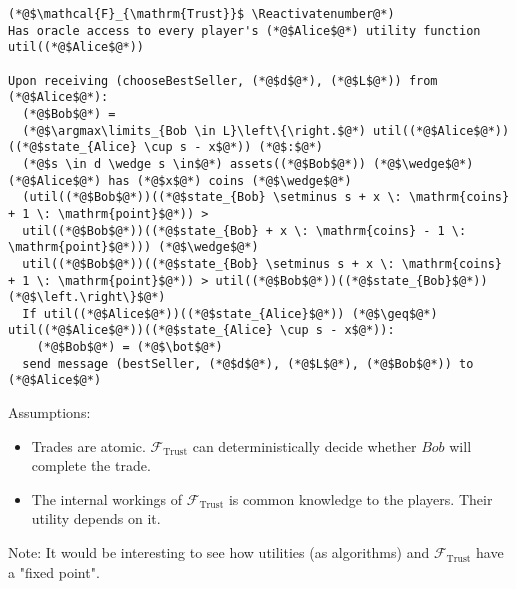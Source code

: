 \Suppressnumber
\begin{lstlisting}[label=trustfunc, style=numbers]
(*@$\mathcal{F}_{\mathrm{Trust}}$ \Reactivatenumber@*)
Has oracle access to every player's (*@$Alice$@*) utility function util((*@$Alice$@*))

Upon receiving (chooseBestSeller, (*@$d$@*), (*@$L$@*)) from (*@$Alice$@*):
  (*@$Bob$@*) =
  (*@$\argmax\limits_{Bob \in L}\left\{\right.$@*) util((*@$Alice$@*))((*@$state_{Alice} \cup s - x$@*)) (*@$:$@*)
  (*@$s \in d \wedge s \in$@*) assets((*@$Bob$@*)) (*@$\wedge$@*) (*@$Alice$@*) has (*@$x$@*) coins (*@$\wedge$@*)
  (util((*@$Bob$@*))((*@$state_{Bob} \setminus s + x \: \mathrm{coins} + 1 \: \mathrm{point}$@*)) >
  util((*@$Bob$@*))((*@$state_{Bob} + x \: \mathrm{coins} - 1 \: \mathrm{point}$@*))) (*@$\wedge$@*)
  util((*@$Bob$@*))((*@$state_{Bob} \setminus s + x \: \mathrm{coins} + 1 \: \mathrm{point}$@*)) > util((*@$Bob$@*))((*@$state_{Bob}$@*)) (*@$\left.\right\}$@*)
  If util((*@$Alice$@*))((*@$state_{Alice}$@*)) (*@$\geq$@*) util((*@$Alice$@*))((*@$state_{Alice} \cup s - x$@*)):
    (*@$Bob$@*) = (*@$\bot$@*)
  send message (bestSeller, (*@$d$@*), (*@$L$@*), (*@$Bob$@*)) to (*@$Alice$@*)
\end{lstlisting}

Assumptions:
\begin{itemize}
  \item Trades are atomic. $\mathcal{F}_{\mathrm{Trust}}$ can deterministically decide whether
  $Bob$ will complete the trade.
  \item The internal workings of $\mathcal{F}_{\mathrm{Trust}}$ is common knowledge to the players.
  Their utility depends on it.
\end{itemize}
Note: It would be interesting to see how utilities (as algorithms) and
$\mathcal{F}_{\mathrm{Trust}}$ have a "fixed point".
